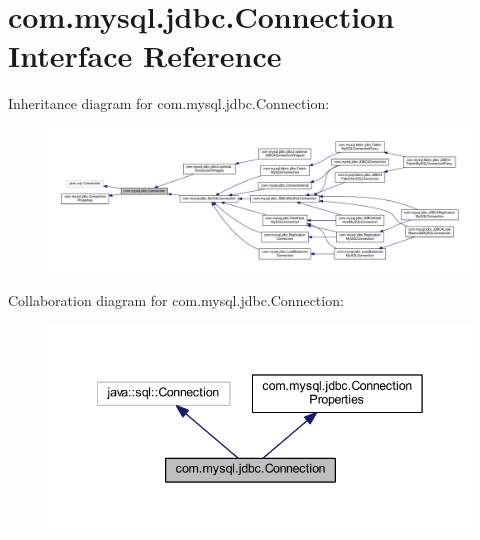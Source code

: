 \hypertarget{interfacecom_1_1mysql_1_1jdbc_1_1_connection}{}\section{com.\+mysql.\+jdbc.\+Connection Interface Reference}
\label{interfacecom_1_1mysql_1_1jdbc_1_1_connection}


Inheritance diagram for com.\+mysql.\+jdbc.\+Connection\+:\nopagebreak
\begin{figure}[H]
\begin{center}
\leavevmode
\includegraphics[width=350pt]{interfacecom_1_1mysql_1_1jdbc_1_1_connection__inherit__graph}
\end{center}
\end{figure}


Collaboration diagram for com.\+mysql.\+jdbc.\+Connection\+:\nopagebreak
\begin{figure}[H]
\begin{center}
\leavevmode
\includegraphics[width=342pt]{interfacecom_1_1mysql_1_1jdbc_1_1_connection__coll__graph}
\end{center}
\end{figure}
